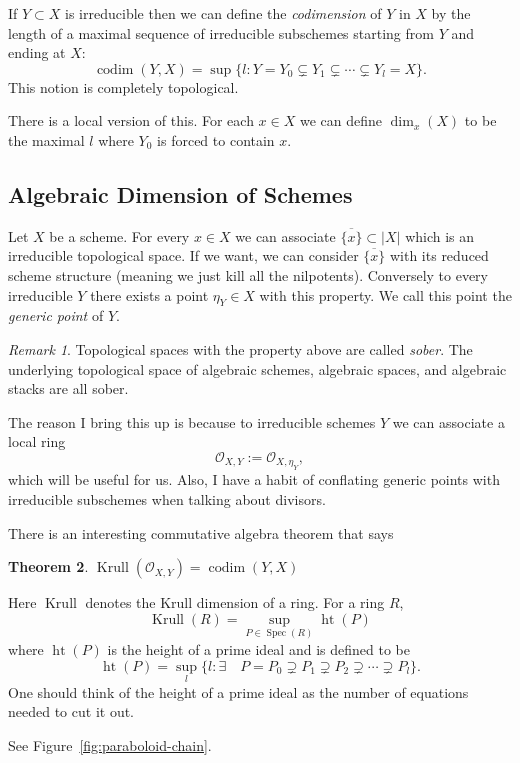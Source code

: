 \documentclass[12pt]{article}
\numberwithin{equation}{section}
\newtheorem{theorem}{Theorem}[subsection]
\theoremstyle{definition}
\theoremstyle{remark}
\newtheorem{remark}[theorem]{Remark}
\newcommand{\Ocal}{\mathcal{O}}
\newcommand{\Spec}{\operatorname{Spec}}
\newcommand{\codim}{\operatorname{codim}}
\newcommand{\Krull}{\operatorname{Krull}}
\newcommand{\height}{\operatorname{ht}}
\begin{document}
If $Y \subset X$ is irreducible then we can define the \emph{codimension} of $Y$ in $X$ by the length of a maximal sequence of irreducible subschemes starting from $Y$ and ending at $X$:
$$ \codim(Y,X) = \sup \lbrace l \colon Y=Y_0 \subsetneq Y_1 \subsetneq \cdots \subsetneq Y_l = X \rbrace. $$
This notion is completely topological. 

There is a local version of this. 
For each $x \in X$ we can define $\dim_x(X)$ to be the maximal $l$ where $Y_0$ is forced to contain $x$.

\subsection{Algebraic Dimension of Schemes}
Let $X$ be a scheme. 
For every $x \in X$ we can associate $\overline{\lbrace x\rbrace} \subset \vert X \vert$ which is an irreducible topological space. 
If we want, we can consider $\overline{\lbrace x \rbrace}$ with its reduced scheme structure (meaning we just kill all the nilpotents). 
Conversely to every irreducible $Y$ there exists a point $\eta_Y \in X$ with this property. 
We call this point the \emph{generic point} of $Y$. 

\begin{remark}
Topological spaces with the property above are called \emph{sober}. 
The underlying topological space of algebraic schemes, algebraic spaces, and algebraic stacks are all sober. 
\end{remark}
The reason I bring this up is because to irreducible schemes $Y$ we can associate a local ring
 $$ \Ocal_{X,Y} := \Ocal_{X,\eta_Y},$$
which will be useful for us. Also, I have a habit of conflating generic points with irreducible subschemes when talking about divisors. 

There is an interesting commutative algebra theorem that says 
\begin{theorem}
	$\Krull(\Ocal_{X,Y}) = \codim(Y,X)$ 
\end{theorem}
Here $\Krull$ denotes the Krull dimension of a ring. 
For a ring $R$, 
$$ \Krull(R) = \sup_{P \in \Spec(R)} \height(P) $$
where $\height(P)$ is the height of a prime ideal and is defined to be 
 $$ \height(P) = \sup_l \lbrace l \colon \exists \quad P = P_0 \supsetneq P_1 \supsetneq P_2 \supsetneq \cdots \supsetneq P_l \rbrace. $$
One should think of the height of a prime ideal as the number of equations needed to cut it out. 

See Figure~\ref{fig:paraboloid-chain}.
\end{document}
